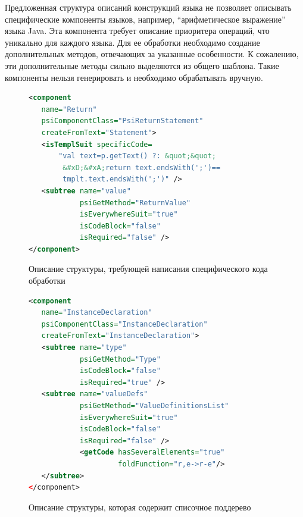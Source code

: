 Предложенная структура описаний конструкций языка не позволяет описывать специфические компоненты языков, например, ``арифметическое выражение'' языка Java. Эта компонента требует описание приоритера операций, что уникально для каждого языка. Для ее обработки необходимо создание дополнительных методов, отвечающих за указанные особенности. К сожалению, эти дополнительные методы сильно выделяются из общего шаблона. Такие компоненты нельзя генерировать и необходимо обрабатывать вручную. 

\begin{figure}[H]
    \begin{lstlisting}[language=xml,basicstyle=\scriptsize]
<component 
   name="Return" 
   psiComponentClass="PsiReturnStatement" 
   createFromText="Statement">
   <isTemplSuit specificCode=
       "val text=p.getText() ?: &quot;&quot;
        &#xD;&#xA;return text.endsWith(';')==
        tmplt.text.endsWith(';')" />        
   <subtree name="value"             
            psiGetMethod="ReturnValue" 
            isEverywhereSuit="true"  
            isCodeBlock="false" 
            isRequired="false" />
</component>
    \end{lstlisting}
\caption{Описание структуры, требующей написания специфического кода обработки}    
\label{specificCode}
\end{figure}

\begin{figure}[H]
    \begin{lstlisting}[language=xml,basicstyle=\scriptsize]
<component 
   name="InstanceDeclaration" 
   psiComponentClass="InstanceDeclaration" 
   createFromText="InstanceDeclaration">        
   <subtree name="type" 
            psiGetMethod="Type"
            isCodeBlock="false" 
            isRequired="true" />        
   <subtree name="valueDefs"   
            psiGetMethod="ValueDefinitionsList" 
            isEverywhereSuit="true"  
            isCodeBlock="false"    
            isRequired="false" />            
            <getCode hasSeveralElements="true" 
                     foldFunction="r,e->r-e"/>        
   </subtree>
</component>
    \end{lstlisting}
\caption{Описание структуры, которая содержит списочное поддерево}    
\label{oneList}
\end{figure}

